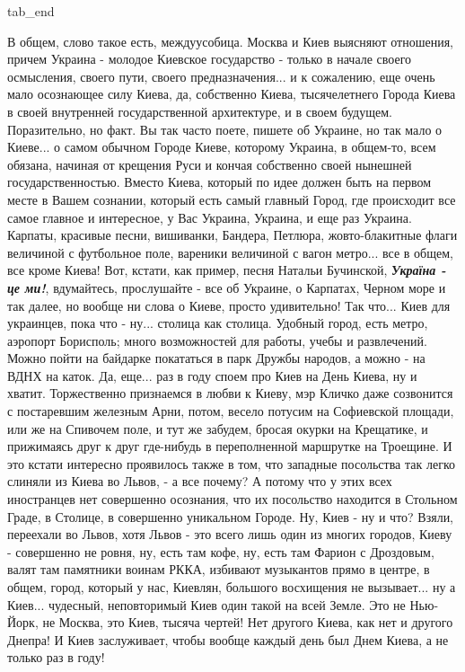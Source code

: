   tab_end
\fi

В общем, слово такое есть, междуусобица.  Москва и Киев выясняют отношения,
причем Украина - молодое Киевское государство - только в начале своего
осмысления, своего пути, своего предназначения... и к сожалению, еще очень мало
осознающее силу Киева, да, собственно Киева, тысячелетнего Города Киева в своей
внутренней государственной архитектуре, и в своем будущем. Поразительно, но
факт. Вы так часто поете, пишете об Украине, но так мало о Киеве... о самом
обычном Городе Киеве, которому Украина, в общем-то, всем обязана, начиная от
крещения Руси и кончая собственно своей нынешней государственностью. Вместо
Киева, который по идее должен быть на первом месте в Вашем сознании, который
есть самый главный Город, где происходит все самое главное и интересное, у Вас
Украина, Украина, и еще раз Украина. Карпаты, красивые песни, вишиванки,
Бандера, Петлюра, жовто-блакитные флаги величиной с футбольное поле, вареники
величиной с вагон метро... все в общем, все кроме Киева! Вот, кстати,
как пример, песня Натальи Бучинской, \emph{\textbf{Україна - це ми!}},
вдумайтесь, прослушайте - все об Украине, о Карпатах, Черном море и так далее,
но вообще ни слова о Киеве, просто удивительно! Так что... Киев для украинцев,
пока что - ну... столица как столица. Удобный город, есть метро, аэропорт
Борисполь; много возможностей для работы, учебы и развлечений. Можно пойти на
байдарке покататься в парк Дружбы народов, а можно - на ВДНХ на каток. Да,
еще... раз в году споем про Киев на День Киева, ну и хватит. Торжественно
признаемся в любви к Киеву, мэр Кличко даже созвонится с постаревшим железным
Арни, потом, весело потусим на Софиевской площади, или же на Спивочем поле, и
тут же забудем, бросая окурки на Крещатике, и прижимаясь друг к друг где-нибудь
в переполненной маршрутке на Троещине. И это кстати интересно проявилось также
в том, что западные посольства так легко слиняли из Киева во Львов, -  а все
почему? А потому что у этих всех иностранцев нет совершенно осознания, что их
посольство находится в Стольном Граде, в Столице, в совершенно уникальном
Городе. Ну, Киев - ну и что?  Взяли, переехали во Львов, хотя Львов - это всего
лишь один из многих городов, Киеву - совершенно не ровня, ну, есть там кофе,
ну, есть там Фарион с Дроздовым, валят там памятники воинам РККА, избивают
музыкантов прямо в центре, в общем, город, который у нас, Киевлян, большого
восхищения не вызывает... ну а Киев...  чудесный, неповторимый Киев один такой
на всей Земле. Это не Нью-Йорк, не Москва, это Киев, тысяча чертей!  Нет
другого Киева, как нет и другого Днепра! И Киев заслуживает, чтобы вообще
каждый день был Днем Киева, а не только раз в году!

